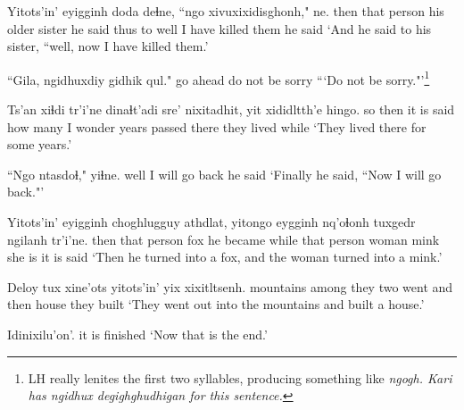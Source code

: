 \documentclass[12pt]{article}
\begin{document}
\gll Yitots'in' eyigginh doda  deɬne, ``ngo xivuxixidisghonh," ne.
then  {that person} {his older sister} {he said thus to} well {I have killed them} {he said}
\glt `And he said to his sister, ``well, now I have killed them.'
\glend

\gll ``Gila, {ngidhuxdiy gidhik qul."}
{go ahead} {do not be sorry}
\glt ```Do not be sorry."'\footnote{LH really lenites the first two syllables, producing something like \em ngogh. \em Kari has \em ngidhux degighghudhigan \em for this sentence.}
\glend

\gll Ts'an xiɬdi tr'i'ne dinaɬt'adi sre'  nixitadhit, yit xididltth'e hingo.
so then {it is said} {how many} {I wonder} {years passed} there {they lived} while
\glt `They lived there for some years.'
\glend

\gll ``Ngo ntasdoɬ,"  yiɬne.
well {I will go back} {he said}
\glt `Finally he said, ``Now I will go back."'
\glend

\gll Yitots'in' eyigginh choghlugguy athdlat, yitongo eygginh nq'oɬonh tuxgedr ngilanh tr'i'ne.
then {that person} fox  {he became} while {that person} woman  mink {she is}  {it is said}
\glt `Then he turned into a fox, and the woman turned into a mink.'
\glend

\gll Deloy  tux xine'ots yitots'in' yix xixitltsenh.
mountains among {they two went} {and then} house {they built}
\glt `They went out into the mountains and built a house.'
\glend

\gll Idinixilu'on'.
{{it is finished}}
\glt `Now that is the end.'
\glend
\end{document}
